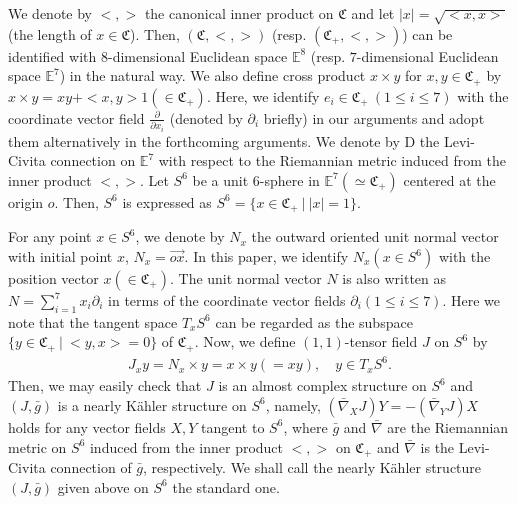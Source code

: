 \documentclass[12pt]{article}
\numberwithin{equation}{section}
\begin{document}
 We denote by $<,>$ the canonical inner product on
$\mathfrak{C}$ and let $|x|=\sqrt{<x,x>}$ (the length of
$x\in\mathfrak{C}$). Then, $(\mathfrak{C}, <,>)$
(resp. $(\mathfrak{C}_{+}, <,>)$) can be identified with $8$-dimensional Euclidean space $\mathbb{E}^{8}$ (resp. $7$-dimensional Euclidean space $\mathbb{E}^{7}$) in the natural
way. We also define cross product $x \times y$ for $x, y
\in\mathfrak{C}_{+}$ by { $x \times y=xy+<x, y>1 (\in\mathfrak{C}_{+})$}. Here, we identify
$e_{i}\in\mathfrak{C}_{+}~(1 \leq i \leq 7)$ with the coordinate
vector field $\frac{\partial}{\partial x_{i}}$ (denoted by
$\partial_{i}$ briefly) in our arguments and adopt them
alternatively in the forthcoming arguments. We denote by D the
Levi-Civita connection on $\mathbb{E}^{7}$ with respect to the
Riemannian metric induced from the inner product $<,>$. Let $S^{6}$
be a unit $6$-sphere in
$\mathbb{E}^{7}(\simeq\mathfrak{C}_{+})$ centered at the origin $o$.
Then, $S^{6}$ is expressed as
$S^{6}=\{x\in\mathfrak{C}_{+}~|~|x|=1\}$.

For any point $x\in S^{6}$, we denote by $N_{x}$ the outward
oriented unit normal vector with initial point $x$,
$N_{x}=\overrightarrow{ox}$. In this paper, we identify $N_{x}(x\in
S^{6})$ with the position vector $x(\in\mathfrak{C}_{+})$. The unit
normal vector $N$ is also written as
$N=\sum_{i=1}^{7}x_{i}\partial_{i}$ in terms of the coordinate vector
fields $\partial_{i}(1\leq i \leq 7)$. Here we note that the tangent
space $T_{x}S^{6}$ can be regarded as the subspace
$\{y\in\mathfrak{C}_{+}~|~<y,x>=0\}$ of $\mathfrak{C}_{+}$. Now, we
define $(1,1)$-tensor field $J$ on $S^{6}$ by
\begin{equation}\label{22}
\begin{split}
J_{x}y=N_{x}\times y=x\times y(=xy),\quad y\in T_{x}S^{6}.
\end{split}
\end{equation}
Then, we may easily check that $J$ is an almost complex structure on
$S^{6}$ and $(J,\bar{g})$ is a nearly K\"ahler structure on $S^{6}$,
namely, $(\bar{\nabla}_{X}J)Y=-(\bar{\nabla}_{Y}J)X$ holds for any
vector fields $X,Y$ tangent to $S^{6}$, where $\bar{g}$ and
$\bar{\nabla}$ are the Riemannian metric on $S^{6}$ induced from the
inner product $<,>$ on $\mathfrak{C}_{+}$ and $\bar{\nabla}$ is the
Levi-Civita connection of $\bar{g}$, respectively. We shall call the
nearly {K\"ahler} structure $(J, \bar{g})$ given above on $S^{6}$
the standard one.


\end{document}
